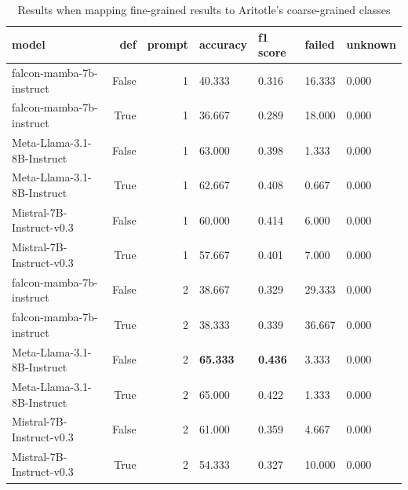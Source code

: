 \begin{table}[H]
\centering
\caption{Results when mapping fine-grained results to Aritotle's coarse-grained classes}
\begin{tabular}{lrrllll}
\toprule
model & def & prompt & accuracy & f1 score & failed & unknown \\
\midrule
falcon-mamba-7b-instruct & False & 1 & 40.333 & 0.316 & 16.333 & 0.000 \\
falcon-mamba-7b-instruct & True & 1 & 36.667 & 0.289 & 18.000 & 0.000 \\
Meta-Llama-3.1-8B-Instruct & False & 1 & 63.000 & 0.398 & 1.333 & 0.000 \\
Meta-Llama-3.1-8B-Instruct & True & 1 & 62.667 & 0.408 & 0.667 & 0.000 \\
Mistral-7B-Instruct-v0.3 & False & 1 & 60.000 & 0.414 & 6.000 & 0.000 \\
Mistral-7B-Instruct-v0.3 & True & 1 & 57.667 & 0.401 & 7.000 & 0.000 \\
falcon-mamba-7b-instruct & False & 2 & 38.667 & 0.329 & 29.333 & 0.000 \\
falcon-mamba-7b-instruct & True & 2 & 38.333 & 0.339 & 36.667 & 0.000 \\
Meta-Llama-3.1-8B-Instruct & False & 2 & \textbf{65.333} & \textbf{0.436} & 3.333 & 0.000 \\
Meta-Llama-3.1-8B-Instruct & True & 2 & 65.000 & 0.422 & 1.333 & 0.000 \\
Mistral-7B-Instruct-v0.3 & False & 2 & 61.000 & 0.359 & 4.667 & 0.000 \\
Mistral-7B-Instruct-v0.3 & True & 2 & 54.333 & 0.327 & 10.000 & 0.000 \\
\bottomrule
\end{tabular}
\end{table}
